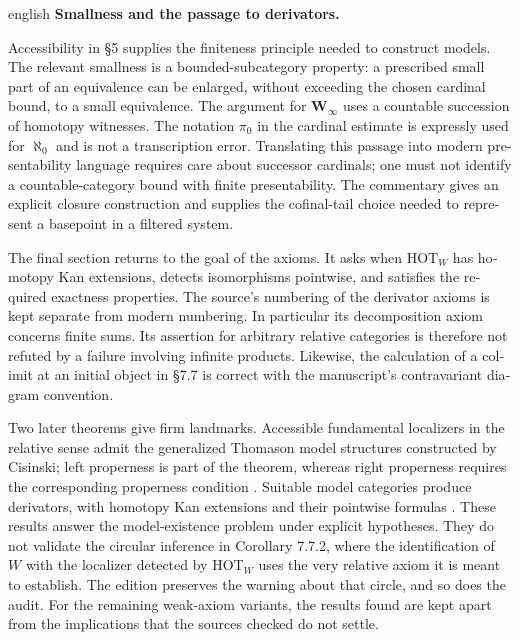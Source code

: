 \begin{otherlanguage}{english}
\begin{otherlanguage*}{english}
\medskip\noindent\textbf{Smallness and the passage to derivators.}

Accessibility in \S5 supplies the finiteness principle needed to construct models. The relevant smallness is a bounded-subcategory property: a prescribed small part of an equivalence can be enlarged, without exceeding the chosen cardinal bound, to a small equivalence. The argument for $\mathbf W_\infty$ uses a countable succession of homotopy witnesses. The notation $\pi_0$ in the cardinal estimate is expressly used for $\aleph_0$ and is not a transcription error. Translating this passage into modern presentability language requires care about successor cardinals; one must not identify a countable-category bound with finite presentability. The commentary gives an explicit closure construction and supplies the cofinal-tail choice needed to represent a basepoint in a filtered system.

The final section returns to the goal of the axioms. It asks when $\mathrm{HOT}_W$ has homotopy Kan extensions, detects isomorphisms pointwise, and satisfies the required exactness properties. The source's numbering of the derivator axioms is kept separate from modern numbering. In particular its decomposition axiom concerns finite sums. Its assertion for arbitrary relative categories is therefore not refuted by a failure involving infinite products. Likewise, the calculation of a colimit at an initial object in \S7.7 is correct with the manuscript's contravariant diagram convention.

Two later theorems give firm landmarks. Accessible fundamental localizers in the relative sense admit the generalized Thomason model structures constructed by Cisinski; left properness is part of the theorem, whereas right properness requires the corresponding properness condition \citep[Theorem 5.2.15]{Cisinski2006}. Suitable model categories produce derivators, with homotopy Kan extensions and their pointwise formulas \citep{Cisinski2003,Groth2013}. These results answer the model-existence problem under explicit hypotheses. They do not validate the circular inference in Corollary 7.7.2, where the identification of $W$ with the localizer detected by $\mathrm{HOT}_W$ uses the very relative axiom it is meant to establish. The edition preserves the warning about that circle, and so does the audit. For the remaining weak-axiom variants, the results found are kept apart from the implications that the sources checked do not settle.

\end{otherlanguage*}
\end{otherlanguage}
\dgrchunkend

